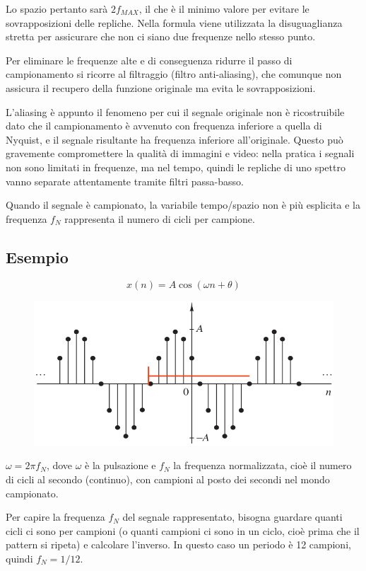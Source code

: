 Lo spazio pertanto sarà $2f_{MAX}$, il che è il minimo valore per evitare le sovrapposizioni delle repliche. Nella formula viene utilizzata la disuguaglianza stretta per assicurare che non ci siano due frequenze nello stesso punto.

Per eliminare le frequenze alte e di conseguenza ridurre il passo di campionamento si ricorre al filtraggio (filtro anti-aliasing), che comunque non assicura il recupero della funzione originale ma evita le sovrapposizioni.

L'aliasing è appunto il fenomeno per cui il segnale originale non è ricostruibile dato che il campionamento è avvenuto con frequenza inferiore a quella di Nyquist, e il segnale risultante ha frequenza inferiore all'originale. Questo può gravemente compromettere la qualità di immagini e video: nella pratica i segnali non sono limitati in frequenze, ma nel tempo, quindi le repliche di uno spettro vanno separate attentamente tramite filtri passa-basso.

Quando il segnale è campionato, la variabile tempo/spazio non è più esplicita e la frequenza $f_N$ rappresenta il numero di cicli per campione.

\subsection{Esempio}
$$x(n) = A\cos(\omega n + \theta)$$
\begin{figure}[h]
	\centering
	\includegraphics[scale=0.56]{Lezioni/Immagini/esempio1}
\end{figure}

$\omega = 2\pi f_N$, dove $\omega$ è la pulsazione e $f_N$ la frequenza normalizzata, cioè il numero di cicli al secondo (continuo), con campioni al posto dei secondi nel mondo campionato.

Per capire la frequenza $f_N$ del segnale rappresentato, bisogna guardare quanti cicli ci sono per campioni (o quanti campioni ci sono in un ciclo, cioè prima che il pattern si ripeta) e calcolare l'inverso. In questo caso un periodo è 12 campioni, quindi $f_N = 1/12$.

